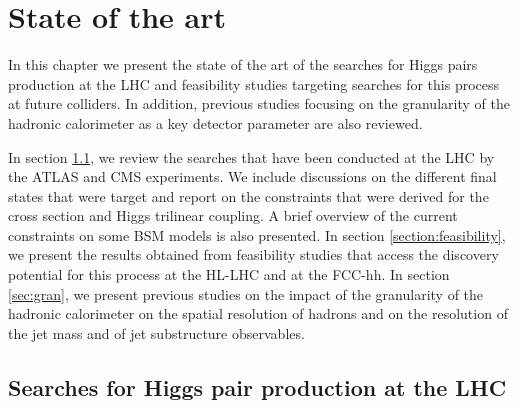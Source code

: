
\chapter{State of the art}
\label{chapter:state}

In this chapter we present the state of the art of the searches for Higgs pairs production at the LHC and  feasibility studies targeting searches for this process at future colliders. In addition, previous studies focusing on the granularity of the hadronic calorimeter as a key detector parameter are also reviewed.

In section \ref{section:previous_searches}, we review the searches that have been conducted at the LHC by the ATLAS and CMS experiments. We include discussions on the different final states that were target and report on the constraints that were derived for the cross section and Higgs trilinear coupling. A brief overview of the current constraints on some BSM models is also presented. In section \ref{section:feasibility}, we present the results obtained from feasibility studies that access the discovery potential for this process at the HL-LHC and at the FCC-hh. In section \ref{sec:gran}, we present previous studies on the impact of the granularity of the hadronic calorimeter on the spatial resolution of hadrons and on the resolution of the jet mass and of jet substructure observables.

\section{Searches for Higgs pair production at the LHC}
\label{section:previous_searches}
%
%

